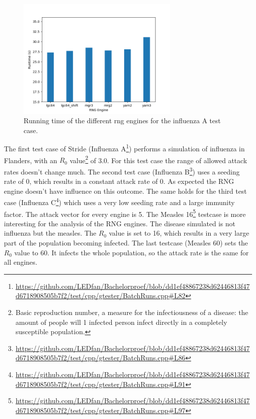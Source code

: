 \documentclass[natbib=true]{acmart}
\begin{document}
\begin{figure}
    \centering
    \includegraphics[width=0.7\textwidth]{images/engine_performance_bar.png}
    \caption{Running time of the different rng engines for the influenza A test case.}
    \label{fig:engine:running}
\end{figure}


The first test case of Stride (Influenza A\footnote{\url{https://github.com/LEDfan/Bachelorproef/blob/dd1ef48867238d62446813f47d6718908505b7f2/test/cpp/gtester/BatchRuns.cpp\#L82}})
performs a simulation of influenza in Flanders, with an $R_0$ value\footnote{Basic reproduction number, a measure for the infectiousness of a disease: the amount of people will 1 infected person infect directly in a completely
susceptible population.} of 3.0. For this test case the range of allowed attack rates doesn't change much. 
The second test case (Influenza B\footnote{\url{https://github.com/LEDfan/Bachelorproef/blob/dd1ef48867238d62446813f47d6718908505b7f2/test/cpp/gtester/BatchRuns.cpp\#L86}}) uses a seeding rate of 0, which results in a constant attack rate of 0. As expected the RNG engine doesn't have influence on this outcome.
The same holds for the third test case (Influenza C\footnote{\url{https://github.com/LEDfan/Bachelorproef/blob/dd1ef48867238d62446813f47d6718908505b7f2/test/cpp/gtester/BatchRuns.cpp\#L91}}) which uses a very low seeding rate and a large immunity factor. The attack vector for every engine is 5.
The Measles 16\footnote{\url{https://github.com/LEDfan/Bachelorproef/blob/dd1ef48867238d62446813f47d6718908505b7f2/test/cpp/gtester/BatchRuns.cpp\#L97}} testcase is more interesting for the analysis of the RNG engines. The disease simulated is not influenza but the measles. The $R_0$ value is set to 16, which results in a very large part of the population becoming infected.
The last testcase (Measles 60) sets the $R_0$ value to 60. It infects the whole population, so the attack rate is the same for all engines.
    
\end{document}

